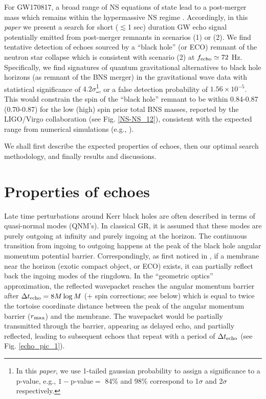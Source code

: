 \documentclass[a4paper,11pt]{article}
\begin{document}
For GW170817,  a broad range of NS equations of state lead to a post-merger mass which remains within the hypermassive NS regime \cite{TheLIGOScientific:2017qsa}. Accordingly, in this {\it paper} we present a search for short ($\lesssim$1 sec) duration GW echo signal potentially emitted from post-merger remnants in scenarios (1) or (2). We find tentative detection of echoes sourced by a ``black hole'' (or ECO) remnant of the neutron star collapse which is consistent with scenario (2) at $f_{\rm echo} \simeq 72$ Hz. 
Specifically, we find signatures of quantum gravitational alternatives to black hole horizons (as remnant of the BNS merger) in the gravitational wave data with statistical significance of $4.2\sigma$\footnote{In this {\it paper}, we use 1-tailed gaussian probability to assign a significance to a p-value, e.g., $1-$p-value$=$ 84\% and 98\% correspond to 1$\sigma$ and 2$\sigma$ respectively.}, or a false detection probability of $1.56 \times 10^{-5}$. This would constrain the spin of the ``black hole'' remnant to be within 0.84-0.87 (0.70-0.87) for the low (high) spin prior total BNS masses, reported by the LIGO/Virgo collaboration \cite{TheLIGOScientific:2017qsa} (see Fig. \ref{NS-NS_12}), consistent with the expected range from numerical simulations (e.g., \cite{Kastaun:2013mv}). 





We shall first describe the expected properties of echoes, then our optimal search methodology, and finally results and discussions.




\section{Properties of echoes}\label{echo_prop}
Late time perturbations around Kerr black holes are often described in terms of  quasi-normal modes (QNM's). 
In classical GR, it is assumed that these modes are purely outgoing at infinity and purely ingoing  at the horizon. The continuous transition from ingoing to outgoing happens at the peak of the black hole angular momentum potential barrier. Correspondingly, as first noticed in \cite{Cardoso:2016rao,Cardoso:2016oxy}, if a membrane near the horizon (exotic compact object, or ECO) exists, it can partially reflect back the ingoing modes of the ringdown. In the ``geometric optics'' approximation, the reflected wavepacket reaches the angular momentum barrier after $\Delta t_{\rm echo}=8M\log M$ (+ spin corrections; see below) which is equal to twice the tortoise coordinate distance between the peak of the angular momentum  barrier ($r_{\rm max}$) and the membrane. The wavepacket would be partially transmitted through the barrier, appearing as delayed echo, and partially reflected, leading to subsequent echoes that repeat with a period of $\Delta t_{\rm echo}$ (see Fig. \ref{echo_pic_1}). 
\end{document}
